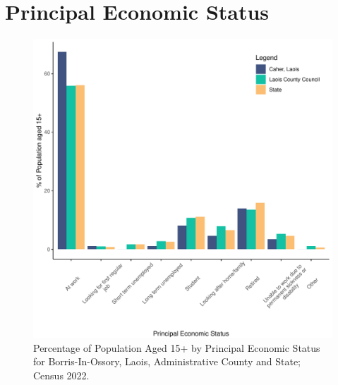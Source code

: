\documentclass{article}
\begin{document}
  
\pagebreak
\section{Principal Economic Status}\label{sect:PES}
\begin{figure}[H]
	\centering
	\includegraphics[width = 140mm]{../figures/PESED.pdf}
	\caption{Percentage of Population Aged 15+ by Principal Economic Status for Borris-In-Ossory, Laois, Administrative County and State; Census 2022.}
	\label{fig:vbnv}
	\end{figure}
\end{document}
